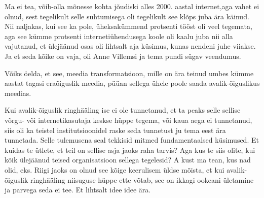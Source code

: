 
Ma ei tea, võib-olla mõnesse kohta jõudiski alles 2000. aastal internet,aga 
vahet ei olnud, sest tegelikult selle suhtumisega oli tegelikult see klõps juba 
ära käinud. Nii naljakas, kui see ka pole, üheksakümmend protsenti tööst oli 
veel tegemata, aga see kümme protsenti internetiühendusega koole oli kaalu juba 
nii alla vajutanud, et  ülejäänud osas oli lihtsalt aja küsimus, kunas nendeni 
juhe viiakse. Ja et seda kõike on vaja, oli Anne Villemsi ja tema pundi sügav veendumus. 


Võiks öelda, et see, meedia transformatsioon, mille on ära teinud umbes kümme 
aastat tagasi eraõiguslik meedia, püüan sellega ühele poole saada 
avalik-õiguslikus meedias.


Kui avalik-õiguslik ringhääling ise ei ole 
tunnetanud, et ta peaks selle  sellise
võrgu- või internetikasutaja keskse hüppe tegema, või  kaua aega ei tunnetanud, 
siis oli ka teistel institutsioonidel  raske seda tunnetust ju tema eest ära 
tunnetada. Selle tulemusena seal tekkisid mitmed fundamentaalsed küsimused. Et 
kuidas te ütlete, et teil on sellise asja jaoks raha tarvis? Aga kus te siis 
olite, kui kõik ülejäänud teised organisatsioon sellega tegelesid? A kust ma 
tean, kus nad olid, eks. Riigi jaoks on olnud see kõige keerulisem  üldse 
mõista, et kui avalik-õiguslik ringhääling niisuguse hüppe ette võtab, see on 
ikkagi ookeani ületamine ja parvega seda ei tee. Et lihtsalt idee idee ära.


